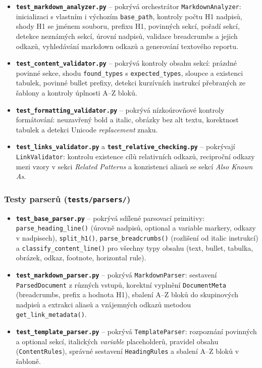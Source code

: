 \documentclass[12pt, a4paper]{article}
\begin{document}
\begin{itemize}
    \item \textbf{\texttt{test\_markdown\_analyzer.py}} -- pokrývá orchestrátor
    \texttt{MarkdownAnalyzer}: inicializaci s vlastním i výchozím \texttt{base\_path},
    kontroly počtu H1 nadpisů, shody H1 se jménem souboru, prefixu H1, povinných sekcí,
    pořadí sekcí, detekce neznámých sekcí, úrovní nadpisů, validace breadcrumbs a jejich
    odkazů, vyhledávání markdown odkazů a generování textového reportu.

    \item \textbf{\texttt{test\_content\_validator.py}} -- pokrývá kontroly obsahu sekcí:
    prázdné povinné sekce, shodu \texttt{found\_types} s \texttt{expected\_types},
    sloupce a existenci tabulek, povinné bullet prefixy, detekci kurzívních instrukcí
    přebraných ze šablony a kontroly úplnosti A--Z bloků.

    \item \textbf{\texttt{test\_formatting\_validator.py}} -- pokrývá nízkoúrovňové kontroly
    formátování: neuzavřený bold a italic, obrázky bez alt textu, korektnost tabulek
    a detekci Unicode \emph{replacement} znaku.

    \item \textbf{\texttt{test\_links\_validator.py}} a \textbf{\texttt{test\_relative\_checking.py}} --
    pokrývají \texttt{LinkValidator}: kontrolu existence cílů relativních odkazů,
    reciproční odkazy mezi vzory v sekci \emph{Related Patterns} a konzistenci aliasů
    se sekcí \emph{Also Known As}.
\end{itemize}

\subsubsection*{Testy parserů (\texttt{tests/parsers/})}

\begin{itemize}
    \item \textbf{\texttt{test\_base\_parser.py}} -- pokrývá sdílené parsovací primitivy:
    \texttt{parse\_heading\_line()} (úrovně nadpisů, optional a variable markery,
    odkazy v nadpisech), \texttt{split\_h1()}, \texttt{parse\_breadcrumbs()}
    (rozlišení od italic instrukcí) a \texttt{classify\_content\_line()} pro všechny
    typy obsahu (text, bullet, tabulka, obrázek, odkaz, footnote, horizontal rule).

    \item \textbf{\texttt{test\_markdown\_parser.py}} -- pokrývá \texttt{MarkdownParser}:
    sestavení \texttt{ParsedDocument} z různých vstupů, korektní vyplnění
    \texttt{DocumentMeta} (breadcrumbs, prefix a hodnota H1), sbalení A--Z bloků
    do skupinových nadpisů a extrakci aliasů a vzájemných odkazů metodou
    \texttt{get\_link\_metadata()}.

    \item \textbf{\texttt{test\_template\_parser.py}} -- pokrývá \texttt{TemplateParser}:
    rozpoznání povinných a optional sekcí, italických \emph{variable} placeholderů,
    pravidel obsahu (\texttt{ContentRules}), správné sestavení \texttt{HeadingRules}
    a sbalení A--Z bloků v šabloně.
\end{itemize}
\end{document}
